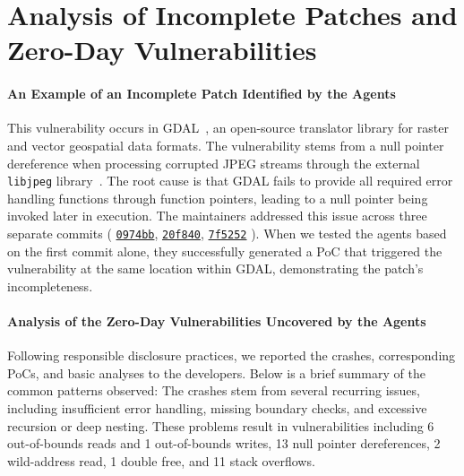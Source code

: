 \section{Analysis of Incomplete Patches and Zero-Day Vulnerabilities}
\label{app:discovery}
\paragraph{An Example of an Incomplete Patch Identified by the Agents}
This vulnerability occurs in GDAL~\citep{gdal_repo}, an open-source translator library for raster and vector geospatial data formats.
The vulnerability stems from a null pointer dereference when processing corrupted JPEG streams through the external \texttt{libjpeg} library~\citep{libjpeg}.
The root cause is that GDAL fails to provide all required error handling functions through function pointers, leading to a null pointer being invoked later in execution.
The maintainers addressed this issue across three separate commits (
\href{https://github.com/OSGeo/gdal/commit/0974bb6283fc09841888bcd8fc9f1c870be2b6ef}{\texttt{0974bb}},
\href{https://github.com/OSGeo/gdal/commit/20f8405375bcd666bda3a117cb9f8629e0422124}{\texttt{20f840}},
\href{https://github.com/OSGeo/gdal/commit/7f5252fc1806867fbedee461551c9521b5078c24}{\texttt{7f5252}}
).
When we tested the agents based on the first commit alone, they successfully generated a PoC that triggered the vulnerability at the same location within GDAL, demonstrating the patch's incompleteness.


\paragraph{Analysis of the Zero-Day Vulnerabilities Uncovered by the Agents}
Following responsible disclosure practices, we reported the crashes, corresponding PoCs, and basic analyses to the developers.
Below is a brief summary of the common patterns observed:
The crashes stem from several recurring issues, including insufficient error handling, missing boundary checks, and excessive recursion or deep nesting.
These problems result in vulnerabilities including 6 out-of-bounds reads and 1 out-of-bounds writes, 13 null pointer dereferences, 2 wild-address read, 1 double free, and 11 stack overflows.

